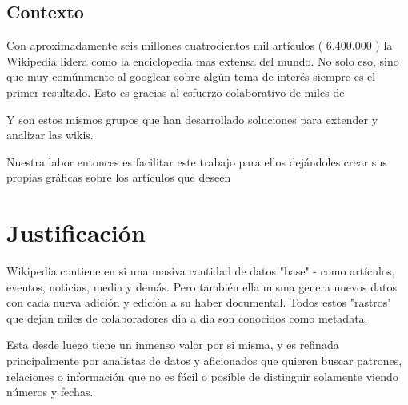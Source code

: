 \subsection{Contexto}



Con aproximadamente seis millones cuatrocientos mil artículos ( 6.400.000 ) la Wikipedia lidera como la enciclopedia mas extensa del mundo. No solo eso, sino que muy comúnmente al googlear sobre algún tema de interés siempre es el primer resultado.
Esto es gracias al esfuerzo colaborativo de miles de 





Y son estos mismos grupos que han desarrollado soluciones para extender y analizar las wikis.





Nuestra labor entonces es facilitar este trabajo para ellos dejándoles crear sus propias gráficas sobre los artículos que deseen

\section{Justificación}

Wikipedia contiene en si una masiva cantidad de datos "base" - como artículos, eventos, noticias, media y demás. Pero también ella misma genera nuevos datos con cada nueva adición y edición a su haber documental. Todos estos "rastros" que dejan miles de colaboradores dia a dia son conocidos como metadata.

Esta desde luego tiene un inmenso valor por si misma, y es refinada principalmente por analistas de datos y aficionados que quieren buscar patrones, relaciones o información que no es fácil o posible de distinguir solamente viendo números y fechas.


